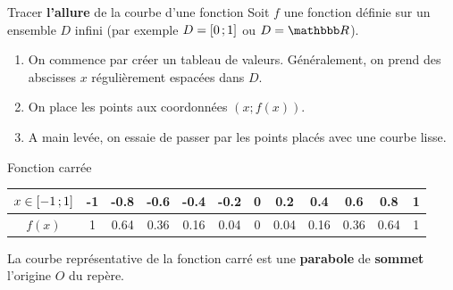 \documentclass[10pt,a4paper,openany,twoside,prof]{book}
\begin{document}
\begin{methode}{Tracer \textbf{l'allure} de la courbe d'une fonction}{}
    Soit $f$ une fonction définie sur un ensemble $D$ infini (par exemple $D=\mathopen{[}0\mathclose{}\mathpunct{};1\mathclose{]}$ ou $D=\R$).
    \begin{enumerate}
        \item
        On commence par créer un tableau de valeurs. Généralement, on prend des abscisses $x$ régulièrement espacées dans $D$.
        \item
        On place les points aux coordonnées $(x; f(x))$.
        \item
        A main levée, on essaie de passer par les points placés avec une courbe \og lisse\fg{}.
    \end{enumerate}
\end{methode}

\begin{ex}{Fonction carrée}{}
    \begin{tabular}{*{12}{|c}|}
    \hline
    $x\in\mathopen{[}-1\mathclose{}\mathpunct{};1\mathclose{]}$ & -1 & -0.8 & -0.6 & -0.4 & -0.2 & 0 & 0.2 & 0.4 & 0.6 & 0.8 & 1 \\
    \hline
    $f(x)$ & 1 & 0.64 & 0.36 & 0.16 & 0.04 & 0 & 0.04 & 0.16 & 0.36 & 0.64 & 1 \\
    \hline
    \end{tabular}

    La courbe représentative de la fonction carré est une \textbf{parabole} de \textbf{sommet} l'origine $O$ du repère.

    \def\xmin{-1}
    \def\xmax{1}
    \def\ymin{0}
    \def\ymax{1}



\end{ex}
\end{document}

